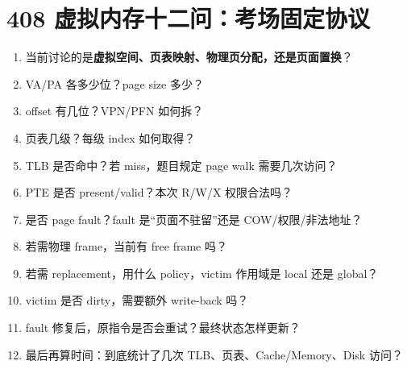 \documentclass[11pt,a4paper]{ctexart}
\newcommand{\kw}[1]{\textbf{#1}}
\begin{document}
\section{408 虚拟内存十二问：考场固定协议}
\begin{corebox}
\begin{enumerate}
  \item 当前讨论的是\kw{虚拟空间、页表映射、物理页分配，还是页面置换}？
  \item VA/PA 各多少位？page size 多少？
  \item offset 有几位？VPN/PFN 如何拆？
  \item 页表几级？每级 index 如何取得？
  \item TLB 是否命中？若 miss，题目规定 page walk 需要几次访问？
  \item PTE 是否 present/valid？本次 R/W/X 权限合法吗？
  \item 是否 page fault？fault 是“页面不驻留”还是 COW/权限/非法地址？
  \item 若需物理 frame，当前有 free frame 吗？
  \item 若需 replacement，用什么 policy，victim 作用域是 local 还是 global？
  \item victim 是否 dirty，需要额外 write-back 吗？
  \item fault 修复后，原指令是否会重试？最终状态怎样更新？
  \item 最后再算时间：到底统计了几次 TLB、页表、Cache/Memory、Disk 访问？
\end{enumerate}
\end{corebox}
\end{document}
